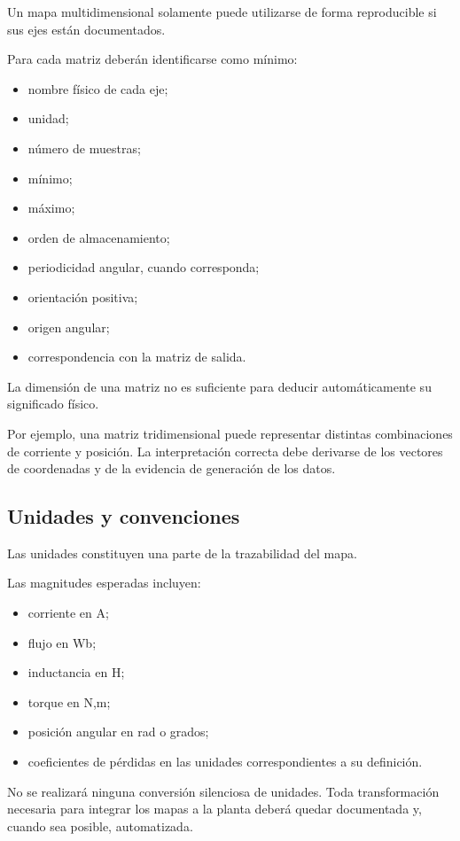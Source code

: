 Un mapa multidimensional solamente puede utilizarse de forma reproducible si sus ejes están documentados.

Para cada matriz deberán identificarse como mínimo:

\begin{itemize}
\item nombre físico de cada eje;
\item unidad;
\item número de muestras;
\item mínimo;
\item máximo;
\item orden de almacenamiento;
\item periodicidad angular, cuando corresponda;
\item orientación positiva;
\item origen angular;
\item correspondencia con la matriz de salida.
\end{itemize}

La dimensión de una matriz no es suficiente para deducir automáticamente su significado físico.

Por ejemplo, una matriz tridimensional puede representar distintas combinaciones de corriente y posición. La interpretación correcta debe derivarse de los vectores de coordenadas y de la evidencia de generación de los datos.

\subsection{Unidades y convenciones}

Las unidades constituyen una parte de la trazabilidad del mapa.

Las magnitudes esperadas incluyen:

\begin{itemize}
\item corriente en A;
\item flujo en Wb;
\item inductancia en H;
\item torque en N,m;
\item posición angular en rad o grados;
\item coeficientes de pérdidas en las unidades correspondientes a su definición.
\end{itemize}

No se realizará ninguna conversión silenciosa de unidades. Toda transformación necesaria para integrar los mapas a la planta deberá quedar documentada y, cuando sea posible, automatizada.

